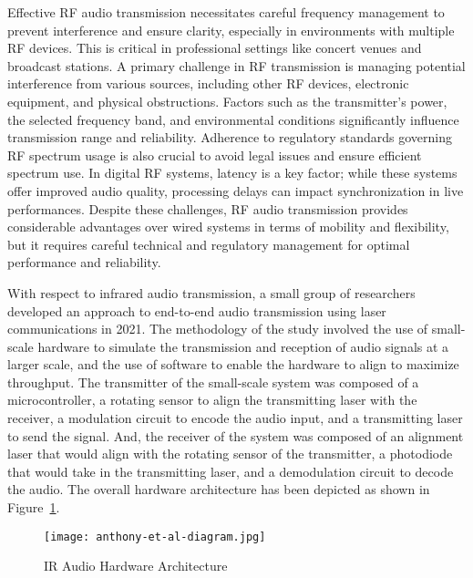\documentclass[conference]{IEEEtran}
\begin{document}
Effective RF audio transmission necessitates careful frequency management to prevent
interference and ensure clarity, especially in environments with multiple RF devices. This is
critical in professional settings like concert venues and broadcast stations. A primary
challenge in RF transmission is managing potential interference from various sources, including
other RF devices, electronic equipment, and physical obstructions. Factors such as the
transmitter's power, the selected frequency band, and environmental conditions significantly
influence transmission range and reliability. Adherence to regulatory standards governing RF
spectrum usage is also crucial to avoid legal issues and ensure efficient spectrum use. In
digital RF systems, latency is a key factor; while these systems offer improved audio quality,
processing delays can impact synchronization in live performances. Despite these challenges, RF
audio transmission provides considerable advantages over wired systems in terms of mobility and
flexibility, but it requires careful technical and regulatory management for optimal performance
and reliability.

With respect to infrared audio transmission, a small group of researchers developed an
approach to end-to-end audio transmission using laser communications in 2021. The methodology
of the study involved the use of small-scale hardware to simulate the transmission and
reception of audio signals at a larger scale, and the use of software to enable the hardware
to align to maximize throughput. The transmitter of the small-scale system was composed of a
microcontroller, a rotating sensor to align the transmitting laser with the receiver, a
modulation circuit to encode the audio input, and a transmitting laser to send the signal.
And, the receiver of the system was composed of an alignment laser that would align with the
rotating sensor of the transmitter, a photodiode that would take in the transmitting laser,
and a demodulation circuit to decode the audio. The overall hardware architecture has been
depicted as shown in Figure~\ref{fig:IR_hardware}.\cite{anthony_approach_2021}

\begin{figure}[htbp]
    \centering
    \texttt{[image: anthony-et-al-diagram.jpg]}
    \caption{IR Audio Hardware Architecture \cite{anthony_approach_2021}}
    \label{fig:IR_hardware}
\end{figure}
\end{document}
